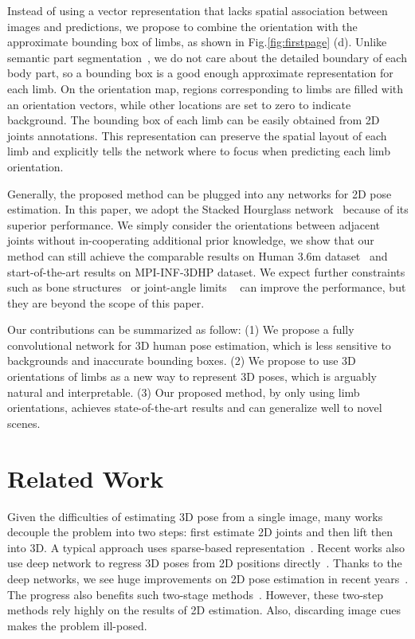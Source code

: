 \documentclass{bmvc2k}
\begin{document}
Instead of using a vector representation that lacks spatial association between images and predictions, we propose to combine the orientation with the approximate bounding box of limbs, as shown in Fig.\ref{fig:firstpage} (d). Unlike semantic part segmentation~\cite{xia2016zoom,gong2017look}, we do not care about the detailed boundary of each body part, so a bounding box is a good enough approximate representation for each limb. 
On the orientation map, regions corresponding to limbs are filled with an orientation vectors,
while other locations are set to zero to indicate background. The bounding box of each limb can be easily obtained from 2D joints annotations. This representation can preserve the spatial layout of each limb and explicitly tells the network where to focus when predicting each limb orientation. 

Generally, the proposed method can be plugged into any networks for 2D pose estimation. In this paper, we adopt the Stacked Hourglass network~\cite{newell2016stacked} because of its superior performance. We simply consider the orientations between adjacent joints without in-cooperating additional prior knowledge, we show that our method can still achieve the comparable results on Human 3.6m dataset~\cite{h36m_pami} and start-of-the-art results on MPI-INF-3DHP dataset\cite{mono-3dhp2017}. We expect further constraints such as bone structures~\cite{sun2017compositional,mono-3dhp2017,fang2018learning} or joint-angle limits ~\cite{akhter2015pose} can improve the performance, but they are beyond the scope of this paper.

Our contributions can be summarized as follow:  (1) We propose a fully convolutional network for 3D human pose estimation, which is less sensitive to backgrounds and inaccurate bounding boxes. (2) We propose to use 3D orientations of limbs as a new way to represent 3D poses, which is arguably natural and interpretable. (3) Our proposed method, by only using limb orientations, achieves state-of-the-art results and can generalize well to novel scenes.

\section{Related Work}
Given the difficulties of estimating 3D pose from a single image, many works  decouple the problem into two steps: first estimate 2D joints and then lift then into 3D. 
A typical approach uses sparse-based representation~\cite{ramakrishna2012reconstructing,zhou20153d}. Recent works also use deep network to regress 3D poses from 2D positions directly~\cite{martinez2017simple}.
Thanks to the deep networks, we see huge improvements on 2D pose estimation in recent years~\cite{toshev2014deeppose,wei2016convolutional,chu2016structured,newell2016stacked,chu2016crf,chu2017multi,cao2017realtime}. The progress also benefits such two-stage methods~\cite{zhou2017monocap}. However, these two-step methods rely highly on the results of 2D estimation. Also, discarding image cues makes the problem ill-posed.
\end{document}
